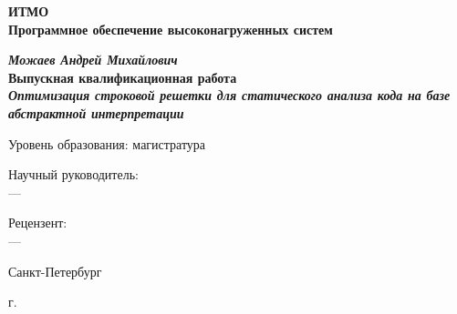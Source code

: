\begin{titlepage}
\begin{center}

\textbf{ИТМО}\\
\textbf{Программное обеспечение высоконагруженных систем}


\vspace{35mm}

\textbf{\textit{\large Можаев Андрей Михайлович}} \\[8mm]
\textbf{\large Выпускная квалификационная работа}\\[3mm]
\textbf{\textit{\large Оптимизация строковой решетки для статического анализа кода на базе абстрактной интерпретации}}

\vspace{20mm}
Уровень образования: магистратура\\


\begin{flushright}
\begin{minipage}[t]{0.65\textwidth}
{Научный руководитель:} \\
---
\vspace{10mm}

{Рецензент:} \\
---
\end{minipage}
\end{flushright}

\vfill

{Санкт-Петербург}
\par{\the\year{} г.}
\end{center}
\end{titlepage}
\restoregeometry
\addtocounter{page}{1}

